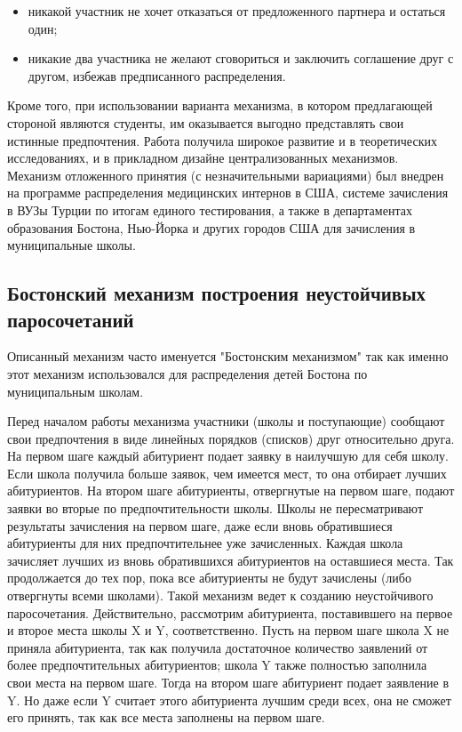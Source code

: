 \begin{itemize}[leftmargin=1.6\parindent]
	\item никакой участник не хочет отказаться от предложенного партнера и остаться один;
	\item никакие два участника не желают сговориться и заключить соглашение 
друг с другом, избежав предписанного распределения.
\end{itemize}

Кроме того, при использовании варианта механизма, в котором предлагающей стороной являются студенты, им оказывается выгодно представлять свои истинные предпочтения. Работа\cite{gale} получила широкое развитие и в теоретических исследованиях, и в прикладном дизайне централизованных механизмов. Механизм
отложенного принятия (с незначительными вариациями) был внедрен
на программе распределения медицинских интернов в США, системе
зачисления в ВУЗы Турции по итогам единого тестирования, а также
в департаментах образования Бостона, Нью-Йорка и других городов
США для зачисления в муниципальные школы.

\subsection{Бостонский механизм построения неустойчивых паросочетаний}

Описанный механизм часто именуется "Бостонским механизмом" так как именно этот механизм использовался для распределения детей Бостона по муниципальным школам.

Перед началом работы механизма участники (школы и поступающие)
сообщают свои предпочтения в виде линейных порядков (списков) друг
относительно друга. На первом шаге каждый абитуриент подает заявку
в наилучшую для себя школу. Если школа получила больше заявок, чем
имеется мест, то она отбирает лучших абитуриентов. На втором шаге
абитуриенты, отвергнутые на первом шаге, подают заявки во вторые по
предпочтительности школы. Школы не пересматривают результаты зачисления на первом шаге, даже если вновь обратившиеся абитуриенты
для них предпочтительнее уже зачисленных. Каждая школа зачисляет
лучших из вновь обратившихся абитуриентов на оставшиеся места. Так
продолжается до тех пор, пока все абитуриенты не будут зачислены
(либо отвергнуты всеми школами).
Такой механизм ведет к созданию неустойчивого паросочетания. Действительно, рассмотрим абитуриента, поставившего на первое и второе
места школы X и Y, соответственно. Пусть на первом шаге школа X не
приняла абитуриента, так как получила достаточное количество заявлений
от более предпочтительных абитуриентов; школа Y также полностью
заполнила свои места на первом шаге. Тогда на втором шаге абитуриент
подает заявление в Y. Но даже если Y считает этого абитуриента лучшим среди всех, она не сможет его принять, так как все места заполнены
на первом шаге.



